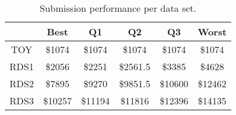 \begin{table}
\footnotesize
\caption{Submission performance per data set.}
\centering
\begin{tabular}{c||c|c|c|c|c}
\hline \hline
                 & Best                 & Q1                 & Q2                & Q3                & Worst \\ 
\hline
TOY & \$1074   & \$1074   & \$1074  & \$1074  & \$1074 \\
\hline
RDS1 & \$2056   & \$2251   & \$2561.5  & \$3385  & \$4628 \\
\hline
RDS2 & \$7895   & \$9270   & \$9851.5  & \$10600  & \$12462 \\
\hline
RDS3 & \$10257   & \$11194   & \$11816  & \$12396  & \$14135 \\
\end{tabular} 
\label{table:result} 
\end{table}
